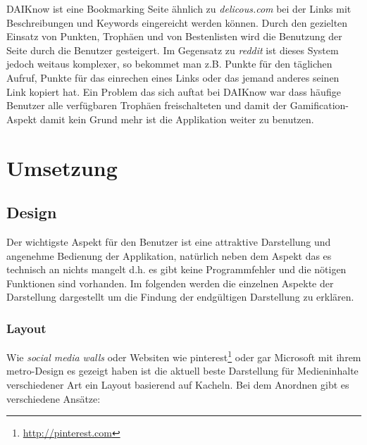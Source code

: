 \documentclass[12pt,twoside]{book}
\begin{document}
DAIKnow\citep{meder2014daiknow} ist eine Bookmarking Seite ähnlich zu \textit{delicous.com} bei der Links mit Beschreibungen und Keywords eingereicht werden können. Durch den gezielten Einsatz von Punkten, Trophäen und von Bestenlisten wird die Benutzung der Seite durch die Benutzer gesteigert. Im Gegensatz zu \textit{reddit} ist dieses System jedoch weitaus komplexer, so bekommet man z.B. Punkte für den täglichen Aufruf, Punkte für das einrechen eines Links oder das jemand anderes seinen Link kopiert hat.
Ein Problem das sich auftat bei DAIKnow war dass häufige Benutzer alle verfügbaren Trophäen freischalteten und damit der Gamification-Aspekt damit kein Grund mehr ist die Applikation weiter zu benutzen.

\chapter{Umsetzung}

\section*{Design}

Der wichtigste Aspekt für den Benutzer ist eine attraktive Darstellung und angenehme Bedienung der Applikation, natürlich neben dem Aspekt das es technisch an nichts mangelt d.h. es gibt keine Programmfehler und die nötigen Funktionen sind vorhanden. Im folgenden werden die einzelnen Aspekte der Darstellung dargestellt um die Findung der endgültigen Darstellung zu erklären.

\subsection*{Layout}

Wie \textit{social media walls} oder Websiten wie pinterest\footnote{\url{http://pinterest.com}} oder gar Microsoft mit ihrem metro-Design es gezeigt haben ist die aktuell beste Darstellung für Medieninhalte verschiedener Art ein Layout basierend auf Kacheln. Bei dem Anordnen gibt es verschiedene Ansätze:
\end{document}
